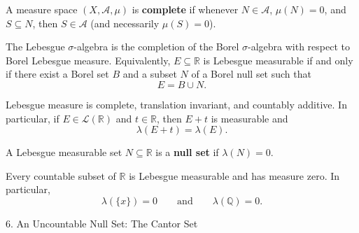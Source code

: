 \documentclass[12pt,a4paper]{article}
\begin{document}
\clearpage

\begin{definition}
    A measure space $(X,\mathcal{A},\mu)$ is \textbf{complete} if whenever $N\in\mathcal{A}$, $\mu(N)=0$, and $S\subseteq N$, then $S\in\mathcal{A}$ (and necessarily $\mu(S)=0$).
\end{definition}

\vspace{30pt}

\begin{theorem}
    The Lebesgue $\sigma$-algebra is the completion of the Borel $\sigma$-algebra with respect to Borel Lebesgue measure. Equivalently, $E\subseteq\mathbb{R}$ is Lebesgue measurable if and only if there exist a Borel set $B$ and a subset $N$ of a Borel null set such that
    \[
        E=B\cup N.
    \]
\end{theorem}

\clearpage

\begin{theorem}
    Lebesgue measure is complete, translation invariant, and countably additive. In particular, if $E\in\mathcal{L}(\mathbb{R})$ and $t\in\mathbb{R}$, then $E+t$ is measurable and
    \[
        \lambda(E+t)=\lambda(E).
    \]
\end{theorem}

\clearpage

\begin{definition}
    A Lebesgue measurable set $N\subseteq\mathbb{R}$ is a \textbf{null set} if $\lambda(N)=0$.
\end{definition}

\vspace{50pt}

\begin{theorem}
    Every countable subset of $\mathbb{R}$ is Lebesgue measurable and has measure zero. In particular,
    \[
        \lambda(\{x\})=0
        \qquad\text{and}\qquad
        \lambda(\mathbb{Q})=0.
    \]
\end{theorem}


\clearpage

\begin{heading}
    6. An Uncountable Null Set: The Cantor Set
\end{heading}

\vspace{10pt}
\end{document}
